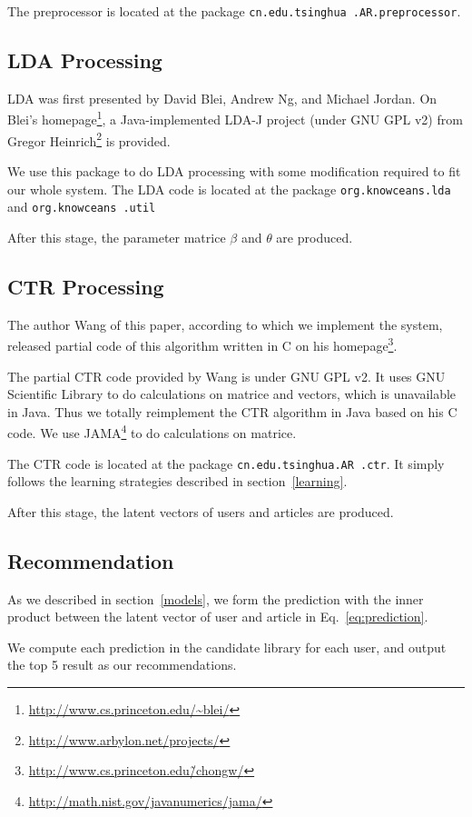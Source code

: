 \documentclass{acm_proc_article-sp}
\begin{document}
The preprocessor is located at the package \texttt{cn.edu.tsinghua .AR.preprocessor}.

\subsection{LDA Processing}
LDA\cite{Hockenmaier_Blei_Ng_Latent_2009} was first presented by David Blei, Andrew Ng, and Michael Jordan. On Blei's homepage\footnote{\url{http://www.cs.princeton.edu/~blei/}}, a Java-implemented LDA-J project (under GNU GPL v2) from Gregor Heinrich\footnote{\url{http://www.arbylon.net/projects/}} is provided.

We use this package to do LDA processing with some modification required to fit our whole system. The LDA code is located at the package \texttt{org.knowceans.lda} and \texttt{org.knowceans .util}

After this stage, the parameter matrice $\beta$ and $\theta$ are produced.

\subsection{CTR Processing}
The author Wang of this paper, according to which we implement the system, released partial code of this algorithm written in C on his homepage\footnote{\url{http://www.cs.princeton.edu/̃chongw/}}.

The partial CTR code provided by Wang is under GNU GPL v2. It uses GNU Scientific Library to do calculations on matrice and vectors, which is unavailable in Java. Thus we totally reimplement the CTR algorithm in Java based on his C code. We use JAMA\footnote{\url{http://math.nist.gov/javanumerics/jama/}} to do calculations on matrice.

The CTR code is located at the package \texttt{cn.edu.tsinghua.AR .ctr}. It simply follows the learning strategies described in section~\ref{learning}.

After this stage, the latent vectors of users and articles are produced.

\subsection{Recommendation}
As we described in section~\ref{models}, we form the prediction with the inner product between the latent vector of user and article in Eq.~\ref{eq:prediction}.

We compute each prediction in the candidate library for each user, and output the top 5 result as our recommendations.
\end{document}
